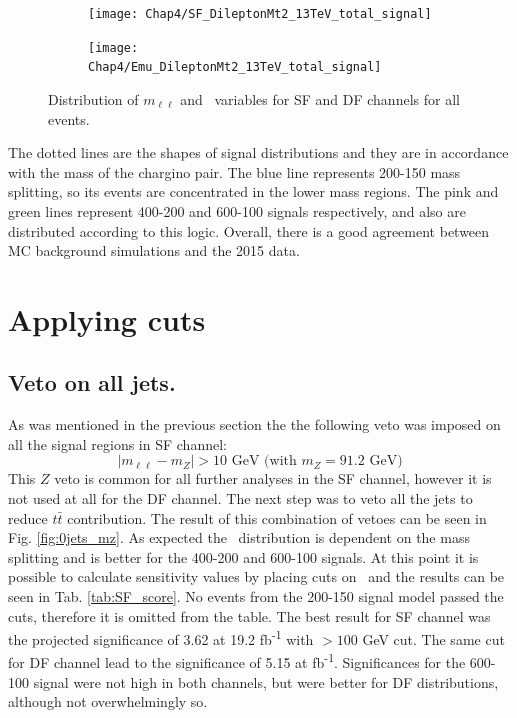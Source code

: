 \begin{figure}[!th]
\begin{subfigure}[t]{0.5\textwidth}
        \end{subfigure}
        \begin{subfigure}[t]{0.5\textwidth}
		\subcaption{} 
		\label{fig:SF_total_mt2}
        \texttt{[image: Chap4/SF\_DileptonMt2\_13TeV\_total\_signal]} 
        \end{subfigure} 
     \begin{subfigure}[t]{0.5\textwidth}
     \subcaption{}
     	\label{fig:DF_total_mt2}
        \texttt{[image: Chap4/Emu\_DileptonMt2\_13TeV\_total\_signal]} 
        \end{subfigure}
        \captionsetup{width=0.8\textwidth}
\caption{Distribution of $m_{\ell \ell}$ and \mttwo \, variables for SF and DF channels for all events.}	
        \label{fig:Elmu_total_histos}
\end{figure}

The dotted lines are the shapes of signal distributions and they are in accordance with the mass of the chargino pair. The blue line represents 200-150 mass splitting, so its events are concentrated in the lower mass regions. The pink and green lines represent 400-200 and 600-100 signals respectively, and also are distributed according to this logic. Overall, there is a good agreement between MC background simulations and the 2015 data. 

\newpage
\section{Applying cuts}
\subsection{Veto on all jets.}

As was mentioned in the previous section the the following veto was imposed on all the signal regions in SF channel:
\begin{equation*}
|m_{\ell \ell} - m_Z| > 10 \text{ GeV (with } m_Z = 91.2 \text{ GeV}) 
\end{equation*}
This $Z$ veto is common for all further analyses in the SF channel, however it is not used at all for the DF channel.
The next step was to veto all the jets to reduce $t\bar{t}$ contribution. The result of this combination of vetoes can be seen in Fig. \ref{fig:0jets_mz}. As expected the \mttwo \, distribution is dependent on the mass splitting and is better for the 400-200 and 600-100 signals. At this point it is possible to calculate sensitivity values by placing cuts on \mttwo \, and the results can be seen in Tab. \ref{tab:SF_score}. No events from the 200-150 signal model passed the cuts, therefore it is omitted from the table. The best result for SF channel was the projected significance of 3.62 at 19.2 fb\textsuperscript{-1}  with \mttwo$>100$ GeV cut. The same cut for DF channel lead to the significance of 5.15  at  fb\textsuperscript{-1}. Significances for the 600-100 signal were not high in both channels, but were better for DF distributions, although not overwhelmingly so. 

